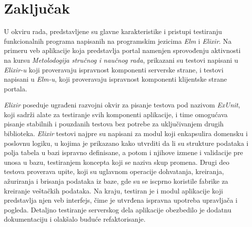 \documentclass[12pt,oneside]{memoir}
\begin{document}



\chapter{Zaključak}
\label{chp:zakljucak}
\par U okviru rada, predstavljene su glavne karakteristike i pristupi testiranju funkcionalnih programa napisanih na programskim jezicima \emph{Elm} i \emph{Elixir}. Na primeru veb aplikacije koja predstavlja portal namenjen sprovođenju aktivnosti na kursu \emph{Metolodogija stručnog i naučnog rada}, prikazani su testovi napisani u \emph{Elixir-u} koji proveravaju ispravnost komponenti serverske strane, i testovi napisani u \emph{Elm-u}, koji proveravaju ispravnost komponenti klijentske strane portala.
\par \emph{Elixir} poseduje ugrađeni razvojni okvir za pisanje testova pod nazivom \emph{ExUnit}, koji sadrži alate za testiranje svih komponenti aplikacije, i time omogućava pisanje stabilnih i pouzdanih testova bez potrebe za uključivanjem drugih biblioteka. \emph{Elixir} testovi najpre su napisani za modul koji enkapsulira domensku i poslovnu logiku, u kojima je prikazano kako utvrditi da li su strukture podataka i polja tabela u bazi ispravno definisane, a potom i njihove izmene i validacije pre unosa u bazu, testiranjem koncepta koji se naziva skup promena. Drugi deo testova proverava upite, koji su uglavnom operacije dohvatanja, kreiranja, ažuriranja i brisanja podataka iz baze, gde su se iscprno koristile fabrike za kreiranje veštačkih podataka. Na kraju, testiran je i modul aplikacije koji predstavlja njen veb interfejs, čime je utvrđena ispravna upotreba upravljača i pogleda. Detaljno testiranje serverskog dela aplikacije obezbedilo je dodatnu dokumentaciju i olakšalo buduće refaktorisanje.
\end{document}
